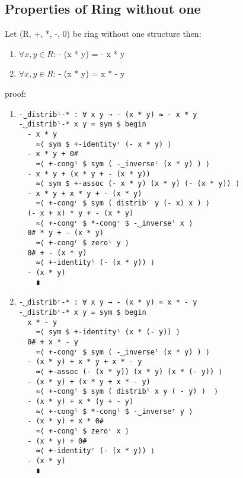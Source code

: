 \subsection{Properties of Ring without one}
Let (R, +, *, -, 0) be ring without one structure then:
\begin{enumerate}
\item \(\forall x, y \in R\): - (x * y) = - x * y\\
\item \(\forall x, y \in R\): - (x * y) = x * - y\\
\end{enumerate}
proof:
\begin{enumerate}
\item
\begin{Verbatim}
-‿distribˡ-* : ∀ x y → - (x * y) ≈ - x * y
-‿distribˡ-* x y = sym $ begin
  - x * y                        
	≈⟨ sym $ +-identityʳ (- x * y) ⟩
  - x * y + 0#                   
	≈⟨ +-congˡ $ sym ( -‿inverseʳ (x * y) ) ⟩
  - x * y + (x * y + - (x * y))  
	≈⟨ sym $ +-assoc (- x * y) (x * y) (- (x * y)) ⟩
  - x * y + x * y + - (x * y)    
	≈⟨ +-congʳ $ sym ( distribʳ y (- x) x ) ⟩
  (- x + x) * y + - (x * y)      
	≈⟨ +-congʳ $ *-congʳ $ -‿inverseˡ x ⟩
  0# * y + - (x * y)             
	≈⟨ +-congʳ $ zeroˡ y ⟩
  0# + - (x * y)                 
	≈⟨ +-identityˡ (- (x * y)) ⟩
  - (x * y)                      
	∎
\end{Verbatim}
\item
\begin{Verbatim}
-‿distribʳ-* : ∀ x y → - (x * y) ≈ x * - y
-‿distribʳ-* x y = sym $ begin
  x * - y                        
	≈⟨ sym $ +-identityˡ (x * (- y)) ⟩
  0# + x * - y                   
	≈⟨ +-congʳ $ sym ( -‿inverseˡ (x * y) ) ⟩
  - (x * y) + x * y + x * - y    
	≈⟨ +-assoc (- (x * y)) (x * y) (x * (- y)) ⟩
  - (x * y) + (x * y + x * - y)  
	≈⟨ +-congˡ $ sym ( distribˡ x y ( - y) )  ⟩
  - (x * y) + x * (y + - y)      
	≈⟨ +-congˡ $ *-congˡ $ -‿inverseʳ y ⟩
  - (x * y) + x * 0#             
	≈⟨ +-congˡ $ zeroʳ x ⟩
  - (x * y) + 0#                 
	≈⟨ +-identityʳ (- (x * y)) ⟩
  - (x * y)                      
	∎
\end{Verbatim}
\end{enumerate}
